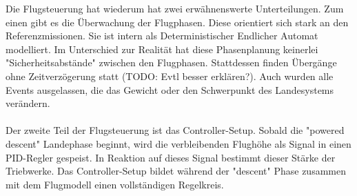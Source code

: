 Die Flugsteuerung hat wiederum hat zwei erwähnenswerte Unterteilungen. Zum einen gibt es die Überwachung der Flugphasen. Diese orientiert sich stark an den Referenzmissionen. Sie ist intern als Deterministischer Endlicher Automat  modelliert. Im Unterschied zur Realität hat diese Phasenplanung keinerlei "Sicherheitsabstände" zwischen den Flugphasen. Stattdessen finden Übergänge ohne Zeitverzögerung statt (TODO: Evtl besser erklären?). Auch wurden alle Events ausgelassen, die das Gewicht oder den Schwerpunkt des Landesystems verändern.\\ \\

Der zweite Teil der Flugsteuerung ist das Controller-Setup. Sobald die "powered descent" Landephase beginnt, wird die verbleibenden Flughöhe als Signal in einen PID-Regler gespeist. In Reaktion auf dieses Signal bestimmt dieser Stärke der Triebwerke. Das Controller-Setup bildet während der "descent" Phase zusammen mit dem Flugmodell einen vollständigen Regelkreis.
